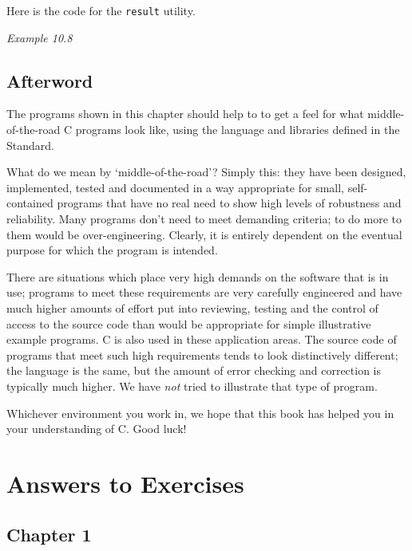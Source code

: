   Here is the code for the \texttt{result} utility.


  \begin{center}\textit{Example 10.8}\end{center}

 
 
        \section{Afterword}
        

  

  The programs shown in this chapter should help to to get a feel for
   what middle-of-the-road C programs look like, using the language and
   libraries defined in the Standard.


  What do we mean by `middle-of-the-road'? Simply this: they have
   been designed, implemented, tested and documented in a way appropriate
   for small, self-contained programs that have no real need to show high
   levels of robustness and reliability. Many programs don't need to meet
   demanding criteria; to do more to them would be over-engineering.
   Clearly, it is entirely dependent on the eventual purpose for which the
   program is intended.


  There are situations which place very high demands on the software that
   is in use; programs to meet these requirements are very carefully
   engineered and have much higher amounts of effort put into reviewing,
   testing and the control of access to the source code than would be
   appropriate for simple illustrative example programs. C is also used in
   these application areas.  The source code of programs that meet such high
   requirements tends to look distinctively different; the language is the
   same, but the amount of error checking and correction is typically much
   higher. We have \textit{not} tried to illustrate that type of
   program.


  Whichever environment you work in, we hope that this book has helped
   you in your understanding of C. Good luck!


 \chapter*{Answers to Exercises}


        \section*{Chapter 1}
        

